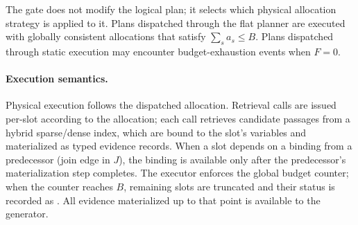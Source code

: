 The gate does not modify the logical plan; it selects which physical allocation strategy is applied to it. Plans dispatched through the flat planner are executed with globally consistent allocations that satisfy $\sum_s a_s \leq B$. Plans dispatched through static execution may encounter budget-exhaustion events when $F = 0$.

\paragraph{Execution semantics.}
Physical execution follows the dispatched allocation. Retrieval calls are issued per-slot according to the allocation; each call retrieves candidate passages from a hybrid sparse/dense index, which are bound to the slot's variables and materialized as typed evidence records. When a slot depends on a binding from a predecessor (join edge in $J$), the binding is available only after the predecessor's materialization step completes. The executor enforces the global budget counter; when the counter reaches $B$, remaining slots are truncated and their status is recorded as . All evidence materialized up to that point is available to the generator.
